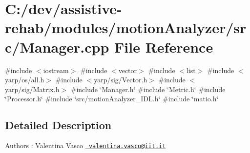 \section{C\+:/dev/assistive-\/rehab/modules/motion\+Analyzer/src/\+Manager.cpp File Reference}
\label{Manager_8cpp}
{\ttfamily \#include $<$iostream$>$}\newline
{\ttfamily \#include $<$vector$>$}\newline
{\ttfamily \#include $<$list$>$}\newline
{\ttfamily \#include $<$yarp/os/all.\+h$>$}\newline
{\ttfamily \#include $<$yarp/sig/\+Vector.\+h$>$}\newline
{\ttfamily \#include $<$yarp/sig/\+Matrix.\+h$>$}\newline
{\ttfamily \#include \char`\"{}Manager.\+h\char`\"{}}\newline
{\ttfamily \#include \char`\"{}Metric.\+h\char`\"{}}\newline
{\ttfamily \#include \char`\"{}Processor.\+h\char`\"{}}\newline
{\ttfamily \#include \char`\"{}src/motion\+Analyzer\+\_\+\+I\+D\+L.\+h\char`\"{}}\newline
{\ttfamily \#include \char`\"{}matio.\+h\char`\"{}}\newline


\subsection{Detailed Description}
\begin{DoxyAuthor}{Authors}
\+: Valentina Vasco \href{mailto:valentina.vasco@iit.it}{\texttt{ valentina.\+vasco@iit.\+it}} 
\end{DoxyAuthor}
